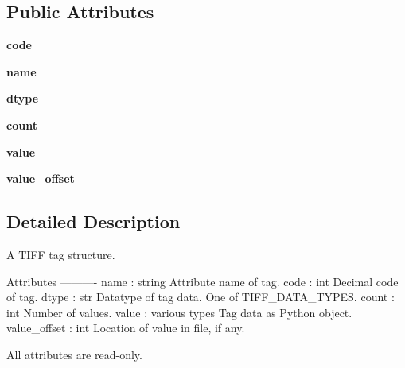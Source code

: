 \subsection*{Public Attributes}
\begin{DoxyCompactItemize}
\item 
\hypertarget{classtifffile_1_1TiffTag_a361450aec8540d6ae10e09a51cdd9bee}{{\bfseries code}}\label{classtifffile_1_1TiffTag_a361450aec8540d6ae10e09a51cdd9bee}

\item 
\hypertarget{classtifffile_1_1TiffTag_ac34a7b79c29ce864523c939668c5e4f7}{{\bfseries name}}\label{classtifffile_1_1TiffTag_ac34a7b79c29ce864523c939668c5e4f7}

\item 
\hypertarget{classtifffile_1_1TiffTag_a31e69f1557e2a9799fdddd2d461c4776}{{\bfseries dtype}}\label{classtifffile_1_1TiffTag_a31e69f1557e2a9799fdddd2d461c4776}

\item 
\hypertarget{classtifffile_1_1TiffTag_a20b7fd8e18b9c23e1e55a9bbdc00da3c}{{\bfseries count}}\label{classtifffile_1_1TiffTag_a20b7fd8e18b9c23e1e55a9bbdc00da3c}

\item 
\hypertarget{classtifffile_1_1TiffTag_a0578d5c23f06bde73d1728eb8da3461b}{{\bfseries value}}\label{classtifffile_1_1TiffTag_a0578d5c23f06bde73d1728eb8da3461b}

\item 
\hypertarget{classtifffile_1_1TiffTag_ac86aee4a1ef18fc194e4f0c753f74002}{{\bfseries value\-\_\-offset}}\label{classtifffile_1_1TiffTag_ac86aee4a1ef18fc194e4f0c753f74002}

\end{DoxyCompactItemize}


\subsection{Detailed Description}
\begin{DoxyVerb}A TIFF tag structure.

Attributes
----------
name : string
    Attribute name of tag.
code : int
    Decimal code of tag.
dtype : str
    Datatype of tag data. One of TIFF_DATA_TYPES.
count : int
    Number of values.
value : various types
    Tag data as Python object.
value_offset : int
    Location of value in file, if any.

All attributes are read-only.\end{DoxyVerb}
 

